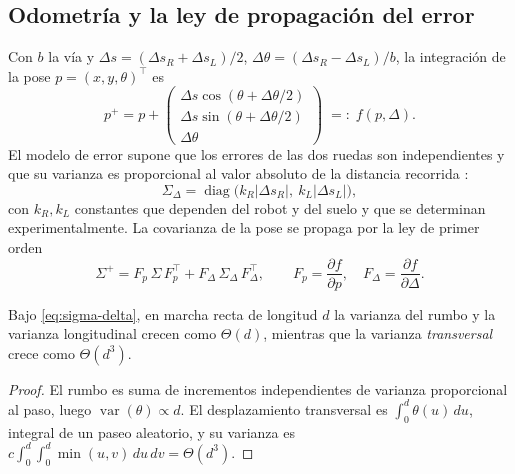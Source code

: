 \subsection{Odometría y la ley de propagación del error}

Con $b$ la vía y $\Delta s=(\Delta s_R+\Delta s_L)/2$,
$\Delta\theta=(\Delta s_R-\Delta s_L)/b$, la integración de la pose
$p=(x,y,\theta)^{\!\top}$ es
\begin{equation}
  p^{+}=p+\begin{pmatrix}
    \Delta s\cos(\theta+\Delta\theta/2)\\
    \Delta s\sin(\theta+\Delta\theta/2)\\
    \Delta\theta\end{pmatrix}
  \;=:\;f(p,\Delta).
  \label{eq:odometria}
\end{equation}
El modelo de error supone que los errores de las dos ruedas son independientes y
que su varianza es proporcional al valor absoluto de la distancia recorrida
\cite{siegwart2011introduction}:
\begin{equation}
  \Sigma_\Delta=\operatorname{diag}\bigl(k_R|\Delta s_R|,\ k_L|\Delta s_L|\bigr),
  \label{eq:sigma-delta}
\end{equation}
con $k_R,k_L$ constantes que dependen del robot y del suelo y que se determinan
experimentalmente. La covarianza de la pose se propaga por la ley de primer
orden
\begin{equation}
  \Sigma^{+}=F_p\,\Sigma\,F_p^{\!\top}+F_\Delta\,\Sigma_\Delta\,F_\Delta^{\!\top},
  \qquad
  F_p=\frac{\partial f}{\partial p},\quad F_\Delta=\frac{\partial f}{\partial\Delta}.
  \label{eq:propagacion}
\end{equation}

\begin{proposicion}
\label{pr:cubo}
Bajo \eqref{eq:sigma-delta}, en marcha recta de longitud $d$ la varianza del
rumbo y la varianza longitudinal crecen como $\Theta(d)$, mientras que la
varianza \emph{transversal} crece como $\Theta(d^{3})$.
\end{proposicion}

\begin{proof}
El rumbo es suma de incrementos independientes de varianza proporcional al paso,
luego $\operatorname{var}(\theta)\propto d$. El desplazamiento transversal es
$\int_0^d\theta(u)\,du$, integral de un paseo aleatorio, y su varianza es
$c\int_0^d\!\!\int_0^d\min(u,v)\,du\,dv=\Theta(d^{3})$.
\end{proof}


